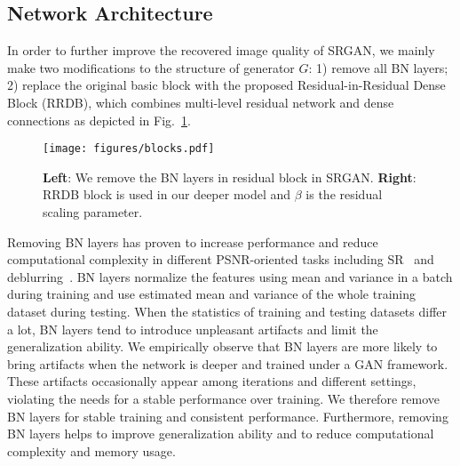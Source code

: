 \documentclass[runningheads]{llncs}
\newcommand{\needtocheck}[1]{{\color{red}{#1}}} %
\begin{document}
\subsection{Network Architecture}
In order to further improve the recovered image quality of SRGAN, we mainly make two modifications to the structure 
of generator $G$: 
1) remove all BN layers; 
2) replace the original basic block with the proposed Residual-in-Residual Dense Block (RRDB), which combines 
multi-level residual network and dense connections as depicted in Fig.~\ref{fig:blocks}.


\begin{figure}[htbp]
	\vspace{-0.2cm}
	\begin{center}
		\texttt{[image: figures/blocks.pdf]}
	\end{center}
	\vspace{-0.3cm}
	\caption{\textbf{Left}: We remove the BN layers in residual block in SRGAN. \textbf{Right}: RRDB block is used in 
		our	deeper model and $\beta$ is the residual scaling parameter.}
	\label{fig:blocks}
	\vspace{-0.3cm}
\end{figure}

Removing BN layers has proven to increase performance and reduce computational complexity in different PSNR-oriented  
tasks including SR~\cite{lim2017enhanced} and deblurring~\cite{nah2017deep}.
%
BN layers normalize the features using mean and variance in a batch during training and use estimated mean and 
variance of the whole training dataset during testing.
%
When the statistics of training and testing datasets differ a lot, BN layers tend to introduce unpleasant artifacts and 
limit the generalization ability. 
We empirically observe that BN layers are more likely to bring artifacts when the network is deeper and trained under 
a GAN framework.
%
These artifacts occasionally appear among iterations and different settings, violating the needs for a stable 
performance over training.
%
We therefore remove BN layers for stable training and consistent performance.  
%
Furthermore, removing BN layers helps to improve generalization ability and to reduce computational complexity and 
memory usage.

%
\end{document}
